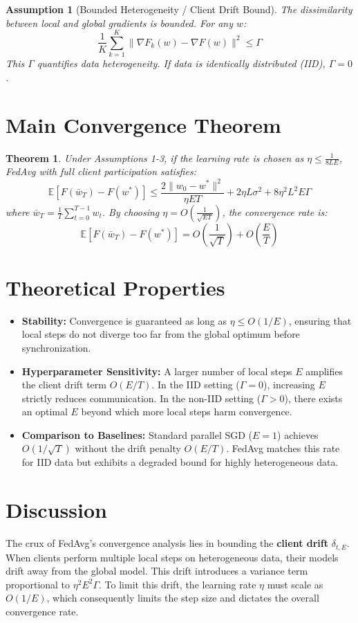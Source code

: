 \documentclass{article}
\newtheorem{theorem}{Theorem}
\newtheorem{assumption}{Assumption}
\begin{document}
\begin{assumption}[Bounded Heterogeneity / Client Drift Bound]
The dissimilarity between local and global gradients is bounded. For any $w$:
$$ \frac{1}{K}\sum_{k=1}^K \|\nabla F_k(w) - \nabla F(w)\|^2 \leq \Gamma $$
This $\Gamma$ quantifies data heterogeneity. If data is identically distributed (IID), $\Gamma = 0$.
\end{assumption}

\section*{Main Convergence Theorem}
\begin{theorem}
Under Assumptions 1-3, if the learning rate is chosen as $\eta \leq \frac{1}{8LE}$, FedAvg with full client participation satisfies:
$$ \mathbb{E}[F(\bar{w}_T) - F(w^*)] \leq \frac{2\|w_0 - w^*\|^2}{\eta ET} + 2\eta L \sigma^2 + 8\eta^2 L^2 E \Gamma $$
where $\bar{w}_T = \frac{1}{T}\sum_{t=0}^{T-1} w_t$. By choosing $\eta = O\left(\frac{1}{\sqrt{ET}}\right)$, the convergence rate is:
$$ \mathbb{E}[F(\bar{w}_T) - F(w^*)] = O\left(\frac{1}{\sqrt{T}}\right) + O\left(\frac{E}{T}\right) $$
\end{theorem}

\section*{Theoretical Properties}
\begin{itemize}
    \item \textbf{Stability:} Convergence is guaranteed as long as $\eta \leq O(1/E)$, ensuring that local steps do not diverge too far from the global optimum before synchronization.
    \item \textbf{Hyperparameter Sensitivity:} A larger number of local steps $E$ amplifies the client drift term $O(E/T)$. In the IID setting ($\Gamma=0$), increasing $E$ strictly reduces communication. In the non-IID setting ($\Gamma>0$), there exists an optimal $E$ beyond which more local steps harm convergence.
    \item \textbf{Comparison to Baselines:} Standard parallel SGD ($E=1$) achieves $O(1/\sqrt{T})$ without the drift penalty $O(E/T)$. FedAvg matches this rate for IID data but exhibits a degraded bound for highly heterogeneous data.
\end{itemize}

\section*{Discussion}
The crux of FedAvg's convergence analysis lies in bounding the \textbf{client drift} $\delta_{t,E}$. When clients perform multiple local steps on heterogeneous data, their models drift away from the global model. This drift introduces a variance term proportional to $\eta^2 E^2 \Gamma$. To limit this drift, the learning rate $\eta$ must scale as $O(1/E)$, which consequently limits the step size and dictates the overall convergence rate.
\end{document}
